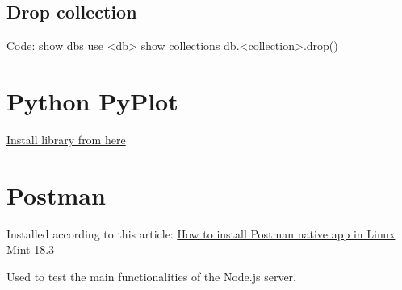 \documentclass[12pt, a4paper, portrait]{article}
\begin{document}
\subsection{Drop collection}
Code:
show dbs
use <db>
show collections
db.<collection>.drop()

\section{Python PyPlot}
\href{https://matplotlib.org/users/installing.html#linux-using-your-package-manager}{Install library from here}

\section{Postman}
Installed according to this article: \href{https://r00t4bl3.com/post/how-to-install-postman-native-app-in-linux-mint-18-3-sylvia}{How to install Postman native app in Linux Mint 18.3}

Used to test the main functionalities of the Node.js server.
\end{document}

